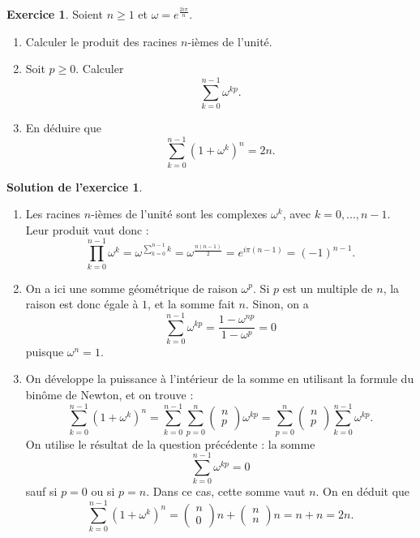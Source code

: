 \documentclass[a4paper, 11pt,openany]{article}%
\theoremstyle{plain}
\theoremstyle{definition}
\newtheorem{exo}{Exercice}
\newtheorem{sol}{Solution de l'exercice}
\theoremstyle{remark}
\begin{document}
\begin{exo}
Soient $n \geqslant 1$ et $\omega = e^{\frac{2i \pi}{n}}$.
\begin{enumerate}
\item Calculer le produit des racines $n$-ièmes de l'unité.
\item Soit $p \geqslant 0$. Calculer
\[ \sum_{k=0}^{n-1} \omega^{kp}.\]
\item En déduire que 
\[ \sum_{k=0}^{n-1} (1 + \omega^k)^n = 2n.\]
\end{enumerate}
\end{exo}

\begin{sol}
\begin{enumerate}
\item Les racines $n$-ièmes de l'unité sont les complexes $\omega^k$, avec $k=0,...,n-1$. Leur produit vaut donc : 
\[ \prod_{k=0}^{n-1} \omega^k = \omega^{\sum_{k=0}^{n-1}k } = \omega^{\frac{n(n-1)}{2}} = e^{i \pi (n-1)} = (-1)^{n-1}.\]
\item On a ici une somme géométrique de raison $\omega^p$. Si $p$ est un multiple de $n$, la raison est donc égale à $1$, et la somme fait $n$. Sinon, on a 
\[ \sum_{k=0}^{n-1} \omega^{kp} = \frac{1-\omega^{np}}{1-\omega^p} = 0\]
 puisque $\omega^n=1$.
 \item On développe la puissance à l'intérieur de la somme en utilisant la formule du binôme de Newton, et on trouve :
 \[ \sum_{k=0}^{n-1} (1 + \omega^k)^n = \sum_{k=0}^{n-1} \sum_{p=0}^n \begin{pmatrix}
  n \\ p
\end{pmatrix} \omega^{kp} = \sum_{p=0}^{n} \begin{pmatrix}
  n \\ p
\end{pmatrix} \sum_{k=0}^{n-1}  \omega^{kp}.\]
 On utilise le résultat de la question précédente : la somme 
 \[ \sum_{k=0}^{n-1} \omega^{kp} = 0\]
sauf si $p=0$ ou si $p=n$. Dans ce cas, cette somme vaut $n$. On en déduit que 
\[  \sum_{k=0}^{n-1} (1 + \omega^k)^n = \begin{pmatrix}
  n \\ 0
\end{pmatrix} n + \begin{pmatrix}
  n \\ n
\end{pmatrix} n = n + n = 2n.\]
\end{enumerate}
\end{sol}
\end{document}
